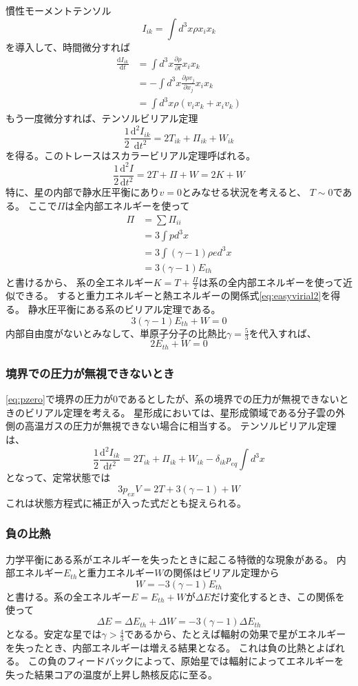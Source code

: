 \documentclass[a4j, dvipdfmx]{jsarticle}
\newcommand{\pder}[2][]{\frac{\partial#1}{\partial#2}}
\newcommand{\dder}[2][]{\frac{\mathrm{d}#1}{\mathrm{d}#2}}
\newcommand{\ddder}[2][]{\frac{\mathrm{d^2}#1}{\mathrm{d}#2^2}}
\newcommand{\half}{\frac{1}{2}}
\newcommand{\ethe}{E_{th}}
\newcommand{\beq}{\begin{equation}}
\newcommand{\eeq}{\end{equation}}
\begin{document}
慣性モーメントテンソル
\beq
    I_{ik} = \int d^3x\rho x_i x_k 
\eeq
を導入して、時間微分すれば
\begin{align}
    \dder[I_{ik}]{t} &= \int d^3x \pder[\rho]{t} x_i x_k \\
                     &= -\int d^3x \pder[\rho v_j]{x_j} x_i x_k\\
                     &= \int d^3x \rho(v_ix_k + x_i v_k)
\end{align}
もう一度微分すれば、テンソルビリアル定理
\beq
\half \ddder[I_{ik}]{t} = 2T_{ik} + \Pi_{ik} + W_{ik}
\eeq
を得る。このトレースはスカラービリアル定理呼ばれる。
\beq
\half \ddder[I]{t} = 2T + \Pi + W = 2K + W
\eeq
特に、星の内部で静水圧平衡にあり$v=0$とみなせる状況を考えると、
$T \sim 0$である。
ここで$\Pi$は全内部エネルギーを使って
\begin{align}
    \Pi &= \sum \Pi_{ii}\\
&= 3 \int p d^3x\\
&= 3 \int (\gamma -1) \rho e d^3x\\
&= 3(\gamma - 1)\ethe
\end{align}
と書けるから、
系の全エネルギー$K = T  + \frac{\Pi}{2}$は系の全内部エネルギーを使って近似できる。
すると重力エネルギーと熱エネルギーの関係式\eqref{eq:easyvirial2}を得る。
静水圧平衡にある系のビリアル定理である。
\beq
3(\gamma -1)\ethe + W = 0\label{eq:easyvirial2}
\eeq
内部自由度がないとみなして、単原子分子の比熱比$\gamma = \frac{5}{3}$を代入すれば、
\beq
    2\ethe + W = 0
\eeq
\subsubsection{境界での圧力が無視できないとき}
\eqref{eq:pzero}で境界の圧力が0であるとしたが、系の境界での圧力が無視できないときのビリアル定理を考える。
星形成においては、星形成領域である分子雲の外側の高温ガスの圧力が無視できない場合に相当する。
テンソルビリアル定理は、
\beq
\half \ddder[I_{ik}]{t} = 2T_{ik} + \Pi_{ik} + W_{ik} - \delta_{ik} p_{eq} \int d^3 x
\eeq
となって、定常状態では
\beq
3p_{ex} V = 2T + 3(\gamma - 1) + W\label{eq:virialpressure}
\eeq
これは状態方程式に補正が入った式だとも捉えられる。
\subsubsection{負の比熱}
力学平衡にある系がエネルギーを失ったときに起こる特徴的な現象がある。
内部エネルギー$E_{th}$と重力エネルギー$W$の関係はビリアル定理から
\beq
W = - 3(\gamma -1) \ethe
\eeq
と書ける。系の全エネルギー$E = \ethe + W$が$\Delta E$だけ変化するとき、この関係を使って
\beq
    \Delta E = \Delta \ethe + \Delta W = -  3(\gamma -1)\Delta \ethe
\eeq
となる。安定な星では$\gamma > \frac{4}{3}$であるから、たとえば輻射の効果で星がエネルギーを失ったとき、内部エネルギーは増える結果となる。
これは負の比熱とよばれる。
この負のフィードバックによって、原始星では輻射によってエネルギーを失った結果コアの温度が上昇し熱核反応に至る。
\end{document}
